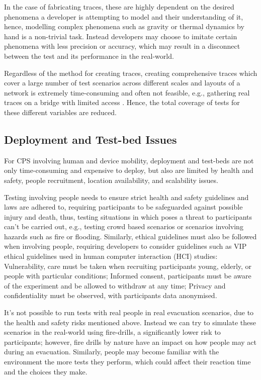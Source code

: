 In the case of fabricating traces, these are highly dependent on the desired phenomena a developer is attempting to model and their understanding of it, hence, modelling complex phenomena such as gravity or thermal dynamics by hand is a non-trivial task. Instead developers may choose to imitate certain phenomena with less precision or accuracy, which may result in a disconnect between the test and its performance in the real-world.

Regardless of the method for creating traces, creating comprehensive traces which cover a large number of test scenarios across different scales and layouts of a network is extremely time-consuming and often not feasible, e.g., gathering real traces on a bridge with limited access \cite{Gaglione2018}. Hence, the total coverage of tests for these different variables are reduced.

\subsection{Deployment and Test-bed Issues} %
\label{ssub:deployment_and_test_bed_issues}

For CPS involving human and device mobility, deployment and test-beds\cite{wisebed1,wisebed2,TempLab,dependibilityTestbedChallenge} are not only time-consuming and expensive to deploy, but also are limited by health and safety, people recruitment, location availability, and scalability issues.

Testing involving people needs to ensure strict health and safety guidelines and laws are adhered to, requiring participants to be safeguarded against possible injury and death, thus, testing situations in which poses a threat to participants can't be carried out, e.g., testing crowd based scenarios or scenarios involving hazards such as fire or flooding. Similarly, ethical guidelines must also be followed when involving people, requiring developers to consider guidelines such as VIP ethical guidelines used in human computer interaction (HCI) studies\cite{blandford2008_controlled_experiments,blandford_pretareporter}: Vulnerability, care must be taken when recruiting participants young, elderly, or people with particular conditions; Informed consent, participants must be aware of the experiment and be allowed to withdraw at any time; Privacy and confidentiality must be observed, with participants data anonymised.

It's not possible to run tests with real people in real evacuation scenarios, due to the health and safety risks mentioned above. Instead we can try to simulate these scenarios in the real-world using fire-drills, a significantly lower risk to participants; however, fire drills by nature have an impact on how people may act during an evacuation. Similarly, people may become familiar with the environment the more tests they perform, which could affect their reaction time and the choices they make. 

